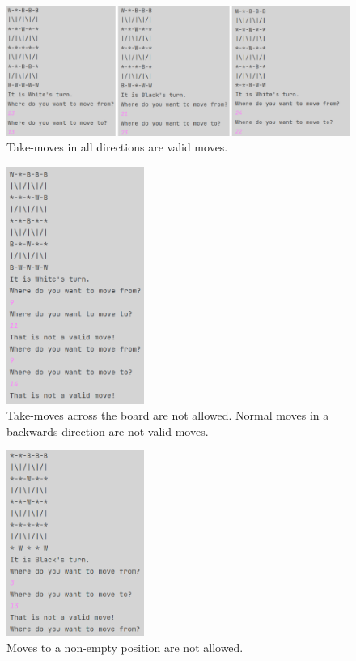 \documentclass[12pt, a4paper]{article}
\begin{document}
\begin{figure}[h]
	\centering
	\caption*{Take-moves in all directions are valid moves.}
	\includegraphics[width=1\textwidth]{isLegalProf/3in1.png}	
\end{figure}

\begin{figure}[h]
	\centering
	\caption*{Take-moves across the board are not allowed. Normal moves in a backwards direction are not valid moves.}
	\includegraphics[width=0.4\textwidth]{isLegalProf/IkkeRykkeBagudEllerOutOfBounds.png}	
\end{figure}

\begin{figure}[h]
	\centering
	\caption*{Moves to a non-empty position are not allowed.}
	\includegraphics[width=0.4\textwidth]{isLegalProf/MåIkkeRykkeTilFelterDerStårEnBrik.png}	
\end{figure}
\end{document}
